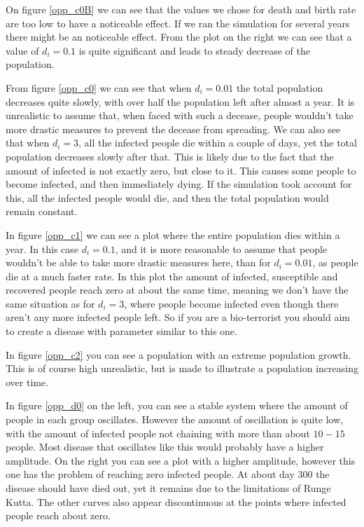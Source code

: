\documentclass[a4paper]{article}
\begin{document}
	On figure \ref{opp_c0B} we can see that the values we chose for death and birth rate are too low to have a noticeable effect. If we ran the simulation for several years there might be an noticeable effect. From the plot on the right we can see that a value of $d_i = 0.1$ is quite significant and leads to steady decrease of the population. 
	
	From figure \ref{opp_c0} we can see that when $d_i=0.01$ the total population decreases quite slowly, with over half the population left after almost a year. It is unrealistic to assume that, when faced with such a decease, people wouldn't take more drastic measures to prevent the decease from spreading. We can also see that when $d_i=3$, all the infected people die within a couple of days, yet the total population decreases slowly after that. This is likely due to the fact that the amount of infected is not exactly zero, but close to it. This causes some people to become infected, and then immediately dying. If the simulation took account for this, all the infected people would die, and then the total population would remain constant. 
	
	In figure \ref{opp_c1} we can see a plot where the entire population dies within a year. In this case $d_i=0.1$, and it is more reasonable to assume that people wouldn't be able to take more drastic measures here, than for $d_i=0.01$, as people die at a much faster rate. 
	In this plot the amount of infected, susceptible and recovered people reach zero at about the same time, meaning we don't have the same situation as for $d_i=3$, where people become infected even though there aren't any more infected people left. So if you are a bio-terrorist you should aim to create a disease with parameter similar to this one. 
	
	In figure \ref{opp_c2} you can see a population with an extreme population growth. This is of course high unrealistic, but is made to illustrate a population increasing over time. 
	
	In figure \ref{opp_d0} on the left, you can see a stable system where the amount of people in each group oscillates. However the amount of oscillation is quite low, with the amount of infected people not chaining with more than about $10-15$ people. Most disease that oscillates like this would probably have a higher amplitude. On the right you can see a plot with a higher amplitude, however this one has the problem of reaching zero infected people. At about day 300 the disease should have died out, yet it remains due to the limitations of Runge Kutta. The other curves also appear discontinuous at the points where infected people reach about zero.
	
\end{document}
